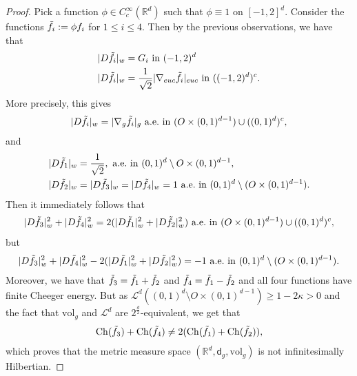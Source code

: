 \documentclass[10pt,a4paper]{amsart}
\newcommand{\Ch}{\mathrm{Ch}}
\newcommand{\R}{\mathbb{R}}
\newcommand{\sfd}{\mathsf d}
\newcommand{\vol}{\mathrm{vol}}
\begin{document}
\begin{proof}
    Pick a function $\phi \in C_c^\infty(\R^d)$ such that $\phi \equiv 1$ on $[-1, 2]^d$. Consider the functions $\Tilde{f}_i := \phi f_i$ for $1 \leq i \leq 4$. Then by the previous observations, we have that 
    \begin{align*}
        &|D\Tilde{f}_i|_w = G_i \ \mathrm{in}\ (-1, 2)^d\\
        &|D\Tilde{f}_i|_w = \frac{1}{\sqrt{2}}|\nabla_{euc} \Tilde{f}_i|_{euc} \ \mathrm{in}\ ((-1,2)^d)^c.
    \end{align*}
    More precisely, this gives
    \begin{align}
        |D\Tilde{f}_i|_w= |\nabla_g \Tilde{f}_i|_g \ \mathrm{a.e.\ in} \ (O\times(0,1)^{d-1}) \cup ((0,1)^{d})^c,
    \end{align}
    and
    \begin{align*}
        &|D\Tilde{f}_1|_w= \frac{1}{\sqrt{2}}, \ \mathrm{a.e.\ in} \ (0,1)^{d}\setminus O\times(0,1)^{d-1}, \\
        &|D\Tilde{f}_2|_w=|D\Tilde{f}_3|_w=|D\Tilde{f}_4|_w=1 \ \mathrm{a.e.\ in} \ (0,1)^{d}\setminus (O\times(0,1)^{d-1}).
    \end{align*}
    Then it immediately follows that 
    \begin{align}
    |D\Tilde{f}_3|_w^2 + |D\Tilde{f}_4|_w^2 = 2(|D\Tilde{f}_1|_w^2 + |D\Tilde{f}_2|_w^2)   \ \mathrm{a.e.\ in} \ (O\times(0,1)^{d-1}) \cup ((0,1)^{d})^c,
    \end{align}
    but 
    \begin{align}
        |D\Tilde{f}_3|_w^2 + |D\Tilde{f}_4|_w^2 - 2(|D\Tilde{f}_1|_w^2 + |D\Tilde{f}_2|_w^2) = -1 \ \mathrm{a.e.\ in} \ (0,1)^{d}\setminus (O\times(0,1)^{d-1}).
    \end{align}
    Moreover, we have that $\Tilde{f}_3 = \Tilde{f}_1 + \Tilde{f}_2$ and $\Tilde{f}_4 = \Tilde{f}_1 - \Tilde{f}_2$ and all four functions have finite Cheeger energy.
    But as $\mathcal{L}^d((0,1)^{d}\setminus O\times(0,1)^{d-1})\geq 1-2\kappa >0$ and the fact that $\vol_g$ and $\mathcal{L}^d$ are $2^{\frac{d}{2}}$-equivalent, we get that 
    \begin{align}
        \Ch(\Tilde{f}_3) + \Ch(\Tilde{f}_4) \neq 2(\Ch(\Tilde{f}_1) + \Ch(\Tilde{f}_2)),
    \end{align}
    which proves that the metric measure space $(\R^d, \sfd_g,  \vol_g)$ is not infinitesimally Hilbertian.
\end{proof}
\end{document}
